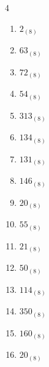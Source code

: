 \begin{multicols}{4}
\begin{enumerate}
  \item $2_{(8)}$

        \phantom{$=2$}

  \item $63_{(8)}$

        \phantom{$=51$}

\columnbreak %

  \item $72_{(8)}$

        \phantom{$=58$}

  \item $54_{(8)}$

        \phantom{$=44$}

  \item $313_{(8)}$

        \phantom{$=203$}

  \item $134_{(8)}$

        \phantom{$=92$}

  \item $131_{(8)}$

        \phantom{$=89$}

  \item $146_{(8)}$

        \phantom{$=102$}

  \item $20_{(8)}$

        \phantom{$=16$}

  \item $55_{(8)}$

        \phantom{$=45$}

  \item $21_{(8)}$

        \phantom{$=17$}

  \item $50_{(8)}$

        \phantom{$=40$}

  \item $114_{(8)}$

        \phantom{$=76$}

  \item $350_{(8)}$

        \phantom{$=232$}

  \item $160_{(8)}$

        \phantom{$=112$}

  \item $20_{(8)}$


\end{enumerate}
\end{multicols}
